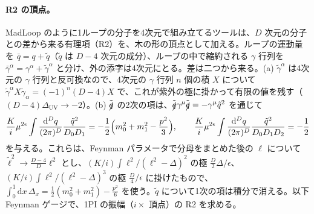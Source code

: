 \documentclass[a4paper,10pt]{ltjsarticle}
\newcommand{\dd}{\mathrm{d}}
\newcommand{\DUV}{\Delta_{\mathrm{UV}}}
\begin{document}
\paragraph{R2 の頂点。}MadLoop のように1ループの分子を4次元で組み立てるツールは、$D$ 次元の分子との差から来る有理項（R2）を、木の形の頂点として加える。ループの運動量を $\bar q=q+\tilde q$（$\tilde q$ は $D-4$ 次元の成分）、ループの中で縮約される $\gamma$ 行列を $\bar\gamma^\alpha=\gamma^\alpha+\tilde\gamma^\alpha$ と分け、外の添字は4次元にとる。差は二つから来る。(a) $\tilde\gamma^\alpha$ は4次元の $\gamma$ 行列と反可換なので、4次元の $\gamma$ 行列 $n$ 個の積 $X$ について $\tilde\gamma^\alpha X\tilde\gamma_\alpha=(-1)^n(D-4)X$ で、これが紫外の極に掛かって有限の値を残す（$(D-4)\DUV\to-2$）。(b) $\tilde{\slashed q}$ の2次の項は、$\tilde{\slashed q}\gamma^\mu\tilde{\slashed q}=-\gamma^\mu\tilde q^2$ を通じて
\begin{equation*}
\frac Ki\mu^{2\epsilon}\int\frac{\dd^Dq}{(2\pi)^D}\frac{\tilde q^2}{D_0D_1}=-\frac12\Bigl(m_0^2+m_1^2-\frac{p^2}{3}\Bigr),\qquad
\frac Ki\mu^{2\epsilon}\int\frac{\dd^Dq}{(2\pi)^D}\frac{\tilde q^2}{D_0D_1D_2}=-\frac12
\end{equation*}
を与える。これらは、Feynman パラメータで分母をまとめた後の $\ell$ について $\tilde\ell^2\to\frac{D-4}{D}\ell^2$ とし、$(K/i)\int\ell^2/(\ell^2-\Delta)^2$ の極 $\frac D2\Delta/\epsilon$、$(K/i)\int\ell^2/(\ell^2-\Delta)^3$ の極 $\frac D4/\epsilon$ に掛けたもので、$\int_0^1\dd x\,\Delta_x=\frac12(m_0^2+m_1^2)-\frac{p^2}{6}$ を使う。$\tilde q$ について1次の項は積分で消える。以下 Feynman ゲージで、1PI の振幅（$i\times$ 頂点）の R2 を求める。
\end{document}
